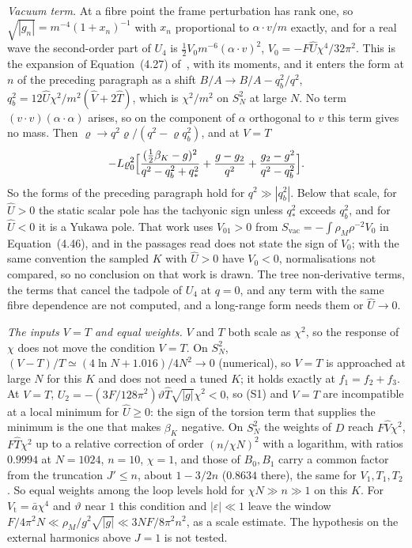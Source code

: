 \emph{Vacuum term.} At a fibre point the frame perturbation has rank one, so \(\sqrt{|g_n|}=m^{-4}(1+x_n)^{-1}\) with \(x_n\) proportional to \(\alpha\cdot v/m\) exactly, and for a real wave the second-order part of \(U_4\) is \(\tfrac12V_0m^{-6}(\alpha\cdot v)^2\), \(V_0=-F\hat U\chi^4/32\pi^2\). This is the expansion of Equation~(4.27) of~\cite{Steinacker2026}, with its moments, and it enters the form at \(n\) of the preceding paragraph as a shift \(B/A\to B/A-q_b^2/q^2\), \(q_b^2=12\hat U\chi^2/m^2(\hat V+2\hat T)\), which is \(\chi^2/m^2\) on \(S^2_N\) at large \(N\). No term \((v\cdot v)(\alpha\cdot\alpha)\) arises, so on the component of \(\alpha\) orthogonal to \(v\) this term gives no mass. Then \(\varrho\to q^2\varrho/(q^2-\varrho q_b^2)\), and at \(V=T\)
\[
-L\varrho_0^2\Bigl[\frac{(\tfrac12\beta_K-g)^2}{q^2-q_b^2+q_*^2}+\frac{g-g_2}{q^2}+\frac{g_2-g^2}{q^2-q_b^2}\Bigr].
\]
So the forms of the preceding paragraph hold for \(q^2\gg|q_b^2|\). Below that scale, for \(\hat U>0\) the static scalar pole has the tachyonic sign unless \(q_*^2\) exceeds \(q_b^2\), and for \(\hat U<0\) it is a Yukawa pole. That work uses \(V_{01}>0\) from \(S_{\mathrm{vac}}=-\int\rho_M\rho^{-2}V_0\) in Equation~(4.46), and in the passages read does not state the sign of \(V_0\); with the same convention the sampled \(K\) with \(\hat U>0\) have \(V_0<0\), normalisations not compared, so no conclusion on that work is drawn. The tree non-derivative terms, the terms that cancel the tadpole of \(U_4\) at \(q=0\), and any term with the same fibre dependence are not computed, and a long-range form needs them or \(\hat U\to0\).

\emph{The inputs \(V=T\) and equal weights.} \(V\) and \(T\) both scale as \(\chi^2\), so the response of \(\chi\) does not move the condition \(V=T\). On \(S^2_N\), \((V-T)/T\simeq(4\ln N+1.016)/4N^2\to0\) (numerical), so \(V=T\) is approached at large \(N\) for this \(K\) and does not need a tuned \(K\); it holds exactly at \(f_1=f_2+f_3\). At \(V=T\), \(U_2=-(3F/128\pi^2)\vartheta\hat T\sqrt{|g|}\chi^2<0\), so (S1) and \(V=T\) are incompatible at a local minimum for \(\hat U\ge0\): the sign of the torsion term that supplies the minimum is the one that makes \(\beta_K\) negative. On \(S^2_N\) the weights of \(D\) reach \(F\hat V\chi^2\), \(F\hat T\chi^2\) up to a relative correction of order \((n/\chi N)^2\) with a logarithm, with ratios \(0.9994\) at \(N=1024\), \(n=10\), \(\chi=1\), and those of \(B_0,B_1\) carry a common factor from the truncation \(J'\le n\), about \(1-3/2n\) (\(0.8634\) there), the same for \(V_1,T_1,T_2\). So equal weights among the loop levels hold for \(\chi N\gg n\gg1\) on this \(K\). For \(V_{\mathrm t}=\bar a\chi^4\) and \(\vartheta\) near \(1\) this condition and \(|\varepsilon|\ll1\) leave the window \(F/4\pi^2N\ll\rho_M/g^2\sqrt{|g|}\ll3NF/8\pi^2n^2\), as a scale estimate. The hypothesis on the external harmonics above \(J=1\) is not tested.

